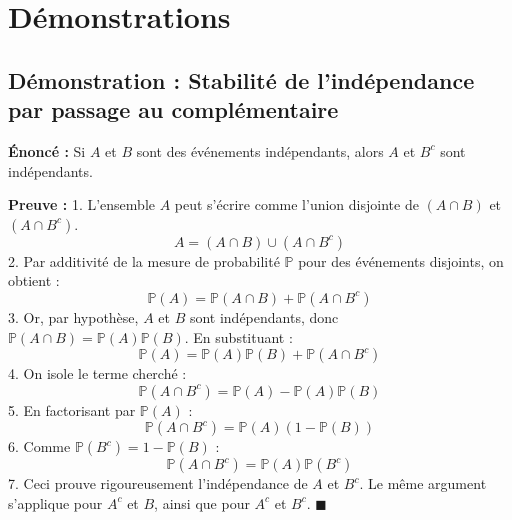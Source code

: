 \documentclass[11pt,a4paper]{article}
\begin{document}
\begin{center}
\end{center}

\section{Démonstrations}

\subsection{Démonstration : Stabilité de l'indépendance par passage au complémentaire}

\textbf{Énoncé :} Si $A$ et $B$ sont des événements indépendants, alors $A$ et $B^c$ sont indépendants.

\textbf{Preuve :}
1. L'ensemble $A$ peut s'écrire comme l'union disjointe de $(A \cap B)$ et $(A \cap B^c)$.
   $$A = (A \cap B) \cup (A \cap B^c)$$
2. Par additivité de la mesure de probabilité $\mathbb{P}$ pour des événements disjoints, on obtient :
   $$\mathbb{P}(A) = \mathbb{P}(A \cap B) + \mathbb{P}(A \cap B^c)$$
3. Or, par hypothèse, $A$ et $B$ sont indépendants, donc $\mathbb{P}(A \cap B) = \mathbb{P}(A)\mathbb{P}(B)$. En substituant :
   $$\mathbb{P}(A) = \mathbb{P}(A)\mathbb{P}(B) + \mathbb{P}(A \cap B^c)$$
4. On isole le terme cherché :
   $$\mathbb{P}(A \cap B^c) = \mathbb{P}(A) - \mathbb{P}(A)\mathbb{P}(B)$$
5. En factorisant par $\mathbb{P}(A)$ :
   $$\mathbb{P}(A \cap B^c) = \mathbb{P}(A) (1 - \mathbb{P}(B))$$
6. Comme $\mathbb{P}(B^c) = 1 - \mathbb{P}(B)$ :
   $$\mathbb{P}(A \cap B^c) = \mathbb{P}(A)\mathbb{P}(B^c)$$
7. Ceci prouve rigoureusement l'indépendance de $A$ et $B^c$. Le même argument s'applique pour $A^c$ et $B$, ainsi que pour $A^c$ et $B^c$. $\blacksquare$
\end{document}
